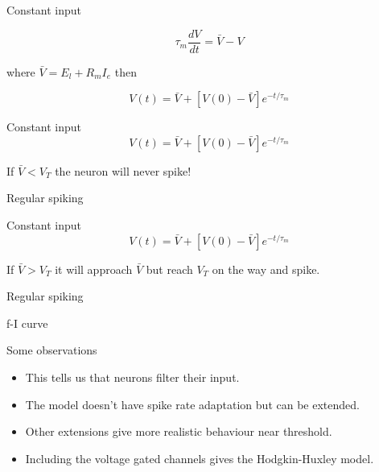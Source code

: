 \documentclass{beamer}
\newcommand{\crish}{\color{reddish}}
\newcommand{\cbla}{\color{black}}
\newcommand{\cblu}{\color{blue}}
\begin{document}
\begin{frame}{Constant input}

  \crish
  $$\tau_m\frac{dV}{dt}=\bar{V}-V$$
  \cbla{}

  where \crish{}$\bar{V}=E_l+R_mI_e$\cbla{} then\crish{}

  $$V(t)=\bar{V}+[V(0)-\bar{V}]e^{-t/\tau_m}$$
\cbla{}
\end{frame}

\begin{frame}{Constant input}
\crish{}
  $$V(t)=\bar{V}+[V(0)-\bar{V}]e^{-t/\tau_m}$$
\cbla{}

If \crish{}$\bar{V}<V_T$\cbla{} the neuron will never spike!
  
\end{frame}


\begin{frame}{Regular spiking}
  \begin{center}
    
\end{center}
  \end{frame}



\begin{frame}{Constant input}
\crish{}
  $$V(t)=\bar{V}+[V(0)-\bar{V}]e^{-t/\tau_m}$$
\cbla{}

If \crish{}$\bar{V}>V_T$\cbla{} it will approach \crish{}$\bar{V}$\cbla{} but reach \crish{}$V_T$\cbla{} on the way and spike.
  
\end{frame}


\begin{frame}{Regular spiking}
  \begin{center}
    
\end{center}
  \end{frame}

\begin{frame}{f-I curve}
  \begin{center}
    
\end{center}
  \end{frame}

\begin{frame}{Some observations}
  \begin{itemize}
  \item This tells us that neurons filter their input.
  \item The model doesn't have spike rate adaptation but can be extended.
  \item Other extensions give more realistic behaviour near threshold.
  \item Including the voltage gated channels gives the \cblu{}Hodgkin-Huxley\cbla{} model.
  \end{itemize}
\end{frame}
\end{document}
